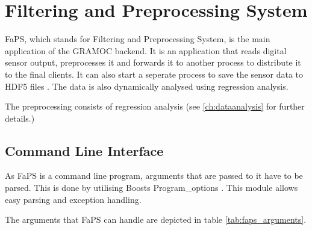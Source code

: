 \chapter{Filtering and Preprocessing System}
\label{ch:faps}

\author{Nico Kratky}
%
FaPS, which stands for Filtering and Preprocessing System, is the main application of the GRAMOC backend. It is an application that reads digital sensor output, preprocesses it and forwards it to another process to distribute it to the final clients. It can also start a seperate process to save the sensor data to HDF5 files \autocite{HDF5}. The data is also dynamically analysed using regression analysis.

The preprocessing consists of regression analysis (see \vref{ch:dataanalysis} for further details.)

\section{Command Line Interface}

As FaPS is a command line program, arguments that are passed to it have to be parsed. This is done by utilising Boosts Program\_options \autocite{BoostProgramOptions}. This module allows easy parsing and exception handling.

The arguments that FaPS can handle are depicted in table \vref{tab:faps_arguments}.

